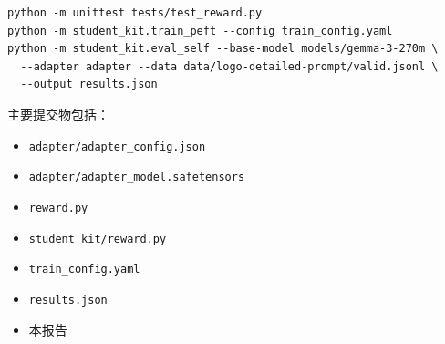 \documentclass[fontset=none]{ctexart}
\begin{document}
\begingroup\footnotesize
\begin{verbatim}
python -m unittest tests/test_reward.py
python -m student_kit.train_peft --config train_config.yaml
python -m student_kit.eval_self --base-model models/gemma-3-270m \
  --adapter adapter --data data/logo-detailed-prompt/valid.jsonl \
  --output results.json
\end{verbatim}
\endgroup

主要提交物包括：

\begin{itemize}
  \item \texttt{adapter/adapter\_config.json}
  \item \texttt{adapter/adapter\_model.safetensors}
  \item \texttt{reward.py}
  \item \texttt{student\_kit/reward.py}
  \item \texttt{train\_config.yaml}
  \item \texttt{results.json}
  \item 本报告
\end{itemize}
\end{document}
